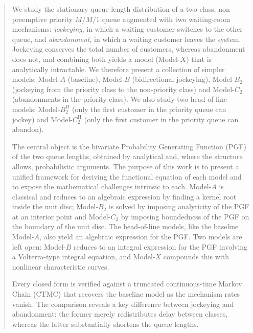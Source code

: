 \documentclass{article}
\numberwithin{equation}{section}
\theoremstyle{remark}
\theoremstyle{plain}
\newcommand{\BH}{B_2^{\mathrm{H}}}
\newcommand{\CH}{C_2^{\mathrm{H}}}
\begin{document}
\begin{abstract}

We study the stationary queue-length distribution of a two-class, non-preemptive priority $M/M/1$ queue augmented with two waiting-room mechanisms: \emph{jockeying}, in which a waiting customer switches to the other queue, and \emph{abandonment}, in which a waiting customer leaves the system. Jockeying conserves the total number of customers, whereas abandonment does not, and combining both yields a model (Model-$X$) that is analytically intractable. We therefore present a collection of simpler models: Model-$A$ (baseline), Model-$B$ (bidirectional jockeying), Model-$B_2$ (jockeying from the priority class to the non-priority class) and Model-$C_2$ (abandonments in the priority class). We also study two head-of-line models: Model-$\BH$ (only the first customer in the priority queue can jockey) and Model-$\CH$ (only the first customer in the priority queue can abandon).

The central object is the bivariate Probability Generating Function (PGF) of the two queue lengths, obtained by analytical and, where the structure allows, probabilistic arguments. The purpose of this work is to present a unified framework for deriving the functional equation of each model and to expose the mathematical challenges intrinsic to each. Model-$A$ is classical and reduces to an algebraic expression by finding a kernel root inside the unit disc; Model-$B_2$ is solved by imposing analyticity of the PGF at an interior point and Model-$C_2$ by imposing boundedness of the PGF on the boundary of the unit disc. The head-of-line models, like the baseline Model-$A$, also yield an algebraic expression for the PGF. Two models are left open: Model-$B$ reduces to an integral expression for the PGF involving a Volterra-type integral equation, and Model-$X$ compounds this with nonlinear characteristic curves.

Every closed form is verified against a truncated continuous-time Markov Chain (CTMC) that recovers the baseline model as the mechanism rates vanish. The comparison reveals a key difference between jockeying and abandonment: the former merely redistributes delay between classes, whereas the latter substantially shortens the queue lengths.
\end{abstract}

\newpage
\tableofcontents
\newpage














% 



\end{document}
